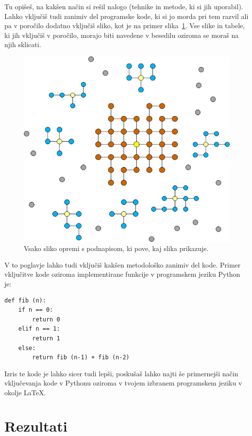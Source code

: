 \documentclass[a4paper,11pt]{article}
\begin{document}
Tu opišeš, na kakšen način si rešil nalogo (tehnike in metode, ki si
jih uporabil). Lahko vključiš tudi zanimiv del programske kode, ki
si jo morda pri tem razvil ali pa v poročilo dodatno vključiš sliko,
kot je na primer slika~\ref{slika1}. Vse slike in tabele, ki jih
vključiš v poročilo, morajo biti navedene v besedilu oziroma se moraš
na njih sklicati.

\begin{figure}[htbp]
\begin{center}
\includegraphics[scale=0.3]{slika-primer.png}
\caption{Vsako sliko opremi s podnapisom, ki pove, kaj slika prikazuje.}
\label{slika1}
\end{center}
\end{figure}

V to poglavje lahko tudi vključiš kakšen metodološko zanimiv del
kode. Primer vključitve kode oziroma implementirane funkcije v
programskem jeziku Python je:

\begin{lstlisting}
def fib (n):
    if n == 0:
        return 0
    elif n == 1:
        return 1
    else:
        return fib (n-1) + fib (n-2)
\end{lstlisting}

Izris te kode je lahko sicer tudi lepši, poskušaš lahko najti še
primernejši način vključevanja kode v Pythonu oziroma v tvojem izbranem
programskem jeziku v okolje \LaTeX{}.

\section{Rezultati}
\end{document}
